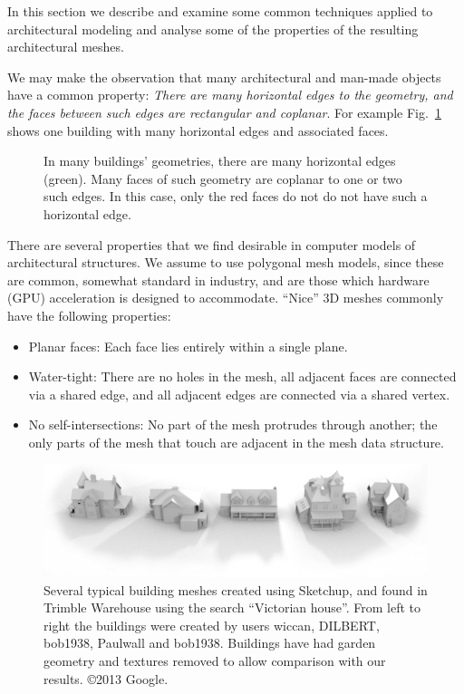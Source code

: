 In this section we describe and examine some common techniques applied to architectural modeling and analyse some of the properties of the resulting architectural meshes. 

We may make the observation that many architectural and man-made objects have a common property: \emph{There are many horizontal edges to the geometry, and the faces between such edges are rectangular and coplanar}. For example Fig.~\ref{fig:horiz_lines} shows one building with many horizontal edges and associated faces.

\begin{figure}
  \centering
  \def\svgwidth{1.0\columnwidth}
  
  \caption[Horizontal edges are common in architectural form]{\label{fig:horiz_lines}In many buildings' geometries, there are many horizontal edges (green). Many faces of such geometry are coplanar to one or two such edges. In this case, only the red faces do not do not have such a horizontal edge.}
\end{figure}

There are several properties that we find desirable in computer models of architectural structures. We assume to use polygonal mesh models, since these are common, somewhat standard in industry, and are those which hardware (GPU) acceleration is designed to accommodate. ``Nice'' 3D meshes commonly have the following properties: 
\begin{itemize}
\item{Planar faces: Each face lies entirely within a single plane.}
\item{Water-tight: There are no holes in the mesh, all adjacent faces are connected via a shared edge, and all adjacent edges are connected via a shared vertex.}
\item{No self-intersections: No part of the mesh protrudes through another; the only parts of the mesh that touch are adjacent in the mesh data structure.}
\end{itemize} 

\begin{figure}
  \centering
  \includegraphics[width=1.0\columnwidth]{googleWarehouseComp.png}
  \caption[Examples of buildings modeled in Sketchup]{\label{fig:googleWarehouseComp} Several typical building meshes created using Sketchup\cite{Sketchup}, and found in Trimble Warehouse\cite{GoogleWarehouse} using the search ``Victorian house''. From left to right the buildings were created by users wiccan, DILBERT, bob1938, Paulwall and bob1938. Buildings have had garden geometry and textures removed to allow comparison with our results. \copyright 2013 Google.}
\end{figure}



